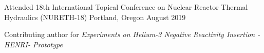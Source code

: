 \begin{cventries}
    \cventry
    {Attended} %
    {18th International Topical Conference on Nuclear Reactor Thermal Hydraulics (NURETH-18)} %
    {Portland, Oregon} %
    {August 2019} %
    {
    \begin{cvitems}
        \item{Contributing author for \textit{Experiments on Helium-3 Negative Reactivity Insertion -HENRI- Prototype}}
    \end{cvitems}
    }






\end{cventries}